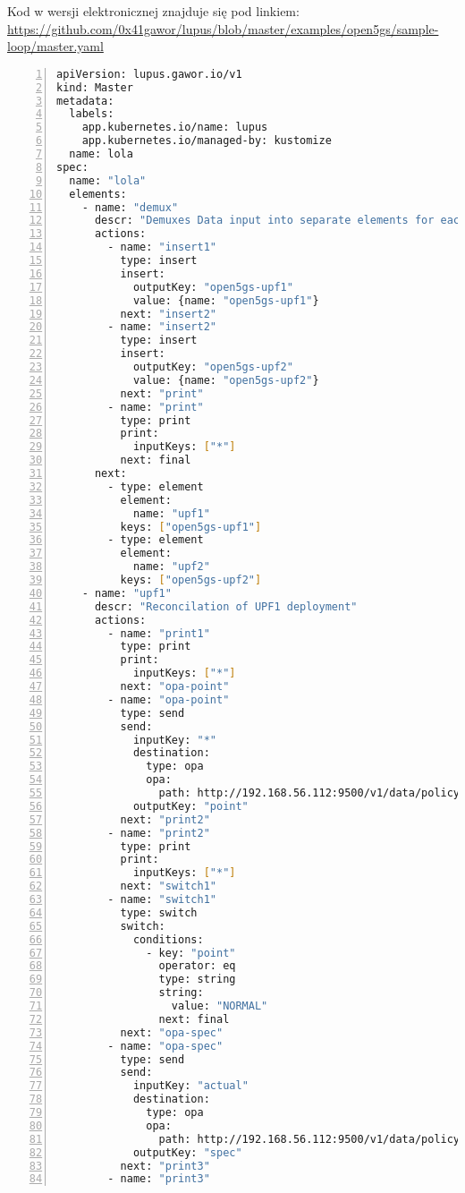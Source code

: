 \hypertarget{appendix:10}{}

Kod w wersji elektronicznej znajduje się pod linkiem: \url{https://github.com/0x41gawor/lupus/blob/master/examples/open5gs/sample-loop/master.yaml}

\begin{lstlisting}[language=sh, caption={\emph{Kod LupN}}, label={lst:a101}, numbers=left, stepnumber=1]
apiVersion: lupus.gawor.io/v1
kind: Master
metadata:
  labels:
    app.kubernetes.io/name: lupus
    app.kubernetes.io/managed-by: kustomize
  name: lola
spec:
  name: "lola"
  elements:
    - name: "demux"
      descr: "Demuxes Data input into separate elements for each UPF"
      actions: 
        - name: "insert1"
          type: insert
          insert:
            outputKey: "open5gs-upf1"
            value: {name: "open5gs-upf1"}
          next: "insert2"
        - name: "insert2"
          type: insert
          insert:
            outputKey: "open5gs-upf2"
            value: {name: "open5gs-upf2"}
          next: "print"
        - name: "print"
          type: print
          print:
            inputKeys: ["*"]
          next: final
      next:
        - type: element
          element:
            name: "upf1"
          keys: ["open5gs-upf1"]
        - type: element
          element:
            name: "upf2"
          keys: ["open5gs-upf2"]
    - name: "upf1"
      descr: "Reconcilation of UPF1 deployment"
      actions:
        - name: "print1"
          type: print
          print:
            inputKeys: ["*"]
          next: "opa-point"
        - name: "opa-point"
          type: send
          send: 
            inputKey: "*"
            destination: 
              type: opa
              opa: 
                path: http://192.168.56.112:9500/v1/data/policy/point
            outputKey: "point"
          next: "print2"
        - name: "print2"
          type: print
          print:
            inputKeys: ["*"]
          next: "switch1"
        - name: "switch1"
          type: switch
          switch:
            conditions:
              - key: "point"
                operator: eq
                type: string
                string: 
                  value: "NORMAL"
                next: final
          next: "opa-spec"
        - name: "opa-spec"
          type: send
          send: 
            inputKey: "actual"
            destination: 
              type: opa
              opa: 
                path: http://192.168.56.112:9500/v1/data/policy/spec
            outputKey: "spec"
          next: "print3"
        - name: "print3"

\end{lstlisting}
